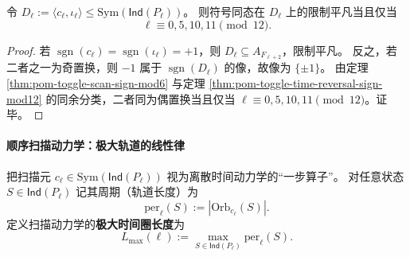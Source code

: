 \begin{corollary}[二面体核的取向特征]\label{cor:pom-toggle-dihedral-orientation-character}
令 \(D_\ell:=\langle c_\ell,\iota_\ell\rangle\le \mathrm{Sym}(\mathsf{Ind}(P_\ell))\)。
则符号同态在 \(D_\ell\) 上的限制平凡当且仅当
\[
\ell\equiv 0,5,10,11\pmod{12}.
\]
\end{corollary}

\begin{proof}
若 \(\operatorname{sgn}(c_\ell)=\operatorname{sgn}(\iota_\ell)=+1\)，则 \(D_\ell\subseteq A_{F_{\ell+2}}\)，限制平凡。
反之，若二者之一为奇置换，则 \(-1\) 属于 \(\operatorname{sgn}(D_\ell)\) 的像，故像为 \(\{\pm 1\}\)。
由定理 \ref{thm:pom-toggle-scan-sign-mod6} 与定理 \ref{thm:pom-toggle-time-reversal-sign-mod12} 的同余分类，二者同为偶置换当且仅当 \(\ell\equiv 0,5,10,11\pmod{12}\)。证毕。
\end{proof}


\paragraph{顺序扫描动力学：极大轨道的线性律}

\begin{definition}[极大时间圈长度]\label{def:pom-toggle-scan-max-orbit}
把扫描元 \(c_\ell\in\mathrm{Sym}(\mathsf{Ind}(P_\ell))\) 视为离散时间动力学的“一步算子”。
对任意状态 \(S\in\mathsf{Ind}(P_\ell)\) 记其周期（轨道长度）为
\[
\mathrm{per}_\ell(S):=|\mathrm{Orb}_{c_\ell}(S)|.
\]
定义扫描动力学的\textbf{极大时间圈长度}为
\[
L_{\max}(\ell):=\max_{S\in\mathsf{Ind}(P_\ell)} \mathrm{per}_\ell(S).
\]
\end{definition}

